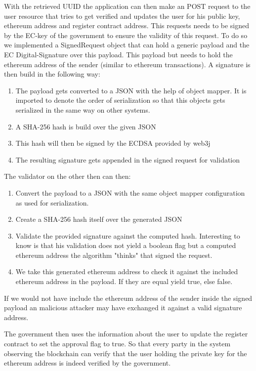 With the retrieved UUID the application can then make an POST request to the user resource that tries to get verified and updates the user for his public key, ethereum address and register contract address. This requests needs to be signed by the EC-key of the government to ensure the validity of this request. To do so we implemented a SignedRequest object that can hold a generic payload and the EC Digital-Signature over this payload. This payload but needs to hold the ethereum address of the sender (similar to ethereum transactions). A signature is then build in the following way: 

\begin{enumerate}
\item The payload gets converted to a JSON with the help of object mapper. It is imported to denote the order of serialization so that this objects gets serialized in the same way on other systems. 
\item A SHA-256 hash is build over the given JSON
\item This hash will then be signed by the ECDSA provided by web3j
\item The resulting signature gets appended in the signed request for validation
\end{enumerate}

The validator on the other then can then:

\begin{enumerate}
\item Convert the payload to a JSON with the same object mapper configuration as used for serialization.
\item Create a SHA-256 hash itself over the generated JSON
\item Validate the provided signature against the computed hash. Interesting to know is that his validation does not yield a boolean flag but a computed ethereum address the algorithm "thinks" that signed the request. 
\item We take this generated ethereum address to check it against the included ethereum address in the payload. If they are equal yield true, else false. 
\end{enumerate}

If we would not have include the ethereum address of the sender inside the signed payload an malicious attacker may have exchanged it against a valid signature address. 

The government then uses the information about the user to update the register contract to set the approval flag to true. So that every party in the system observing the blockchain can verify that the user holding the private key for the ethereum address is indeed verified by the government. 

